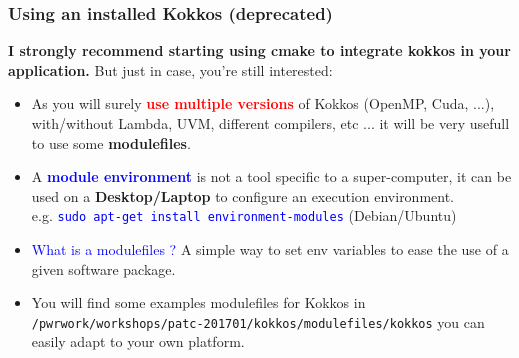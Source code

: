 \begin{frame}[fragile=singleslide]
  \frametitle{Using an installed Kokkos (deprecated)}

  {\large \bf I strongly recommend starting using cmake to integrate kokkos in your application.} But just in case, you're still interested:
  \begin{itemize}
  \item As you will surely \textcolor{red}{\textbf{use multiple versions}} of Kokkos (OpenMP, Cuda, ...), with/without Lambda, UVM, different compilers, etc ... it will be very usefull to use some \textbf{modulefiles}.
  \item A \textcolor{blue}{\textbf{module environment}} is not a tool specific to a super-computer, it can be used on a \textbf{Desktop/Laptop} to configure an execution environment.\\
    e.g. \textcolor{blue}{\texttt{sudo apt-get install environment-modules}} (Debian/Ubuntu)
  \item \textcolor{blue}{What is a modulefiles ?}
    A simple way to set env variables to ease the use of a given software package.
  \item You will find some examples modulefiles for Kokkos in \texttt{/pwrwork/workshops/patc-201701/kokkos/modulefiles/kokkos} you can easily adapt to your own platform.
  \end{itemize}

\end{frame}

